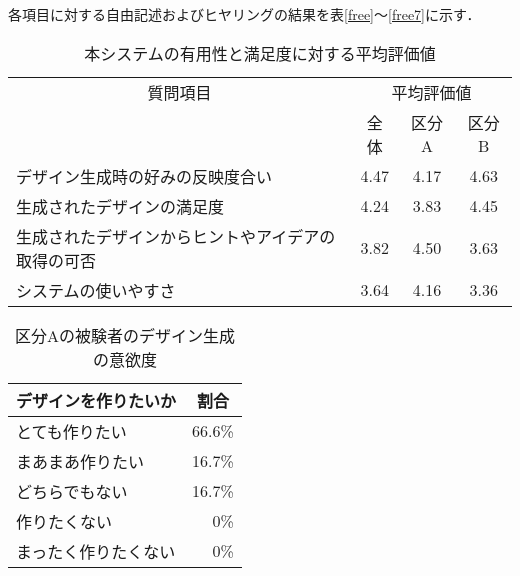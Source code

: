 各項目に対する自由記述およびヒヤリングの結果を表\ref{free}～\ref{free7}に示す．

\begin{table}[htbp]
	\centering
	\caption{本システムの有用性と満足度に対する平均評価値}
	\begin{tabular}{|l|c|c|c|} \hline
    \multicolumn{1}{|c|}{質問項目} & \multicolumn{3}{|c|}{平均評価値} \\ \cline{2-4}
                                &全体 &区分A & 区分B\\ \hline
	デザイン生成時の好みの反映度合い & 4.47 & 4.17  & 4.63\\ \hline
    生成されたデザインの満足度 & 4.24 & 3.83 & 4.45 \\ \hline
    生成されたデザインからヒントやアイデアの取得の可否 & 3.82 & 4.50 & 3.63 \\ \hline
	システムの使いやすさ & 3.64 & 4.16  &3.36 \\ \hline 
	\end{tabular}
	\label{result}
\end{table}

\begin{table}[htbp]
    	\centering
    	\caption{区分Aの被験者のデザイン生成の意欲度}
    	\begin{tabular}{|l|r|} \hline
    	\multicolumn{1}{|c|}{デザインを作りたいか} & \multicolumn{1}{|c|}{割合}   \\ \hline
        とても作りたい & 66.6\%   \\ \hline
        まあまあ作りたい & 16.7\%  \\ \hline
        どちらでもない  & 16.7\%   \\ \hline
        作りたくない& 0\%   \\ \hline
        まったく作りたくない  & 0\%   \\ \hline 
    	\end{tabular}
    	\label{result01}
\end{table}


